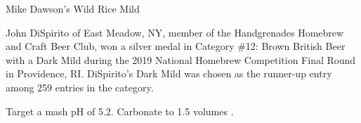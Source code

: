 \stylesection{\stylemild}

\begin{recipie}{Mike Dawson's Wild Rice Mild}

\begin{aboutblock}
John DiSpirito of East Meadow, NY, member of the Handgrenades Homebrew and Craft Beer
Club, won a silver medal in Category \#12: Brown British Beer with a Dark Mild during
the 2019 National Homebrew Competition Final Round in Providence, RI. DiSpirito's
Dark Mild was chosen as the runner-up entry among 259 entries in the category.
\end{aboutblock}


\begin{methodandtiming}
 
\begin{mashsteps}
\end{mashsteps}

\begin{fermentationsteps}
\end{fermentationsteps}

\begin{directions}
Target a mash pH of 5.2. Carbonate to 1.5 volumes .
\end{directions}

\end{methodandtiming}

\pagebreak

\begin{ingredientsblock}

\begin{malts}
\end{malts}

\begin{hops}
\end{hops}

\begin{yeasts}
\end{yeasts}

\end{ingredientsblock}

\end{recipie}

